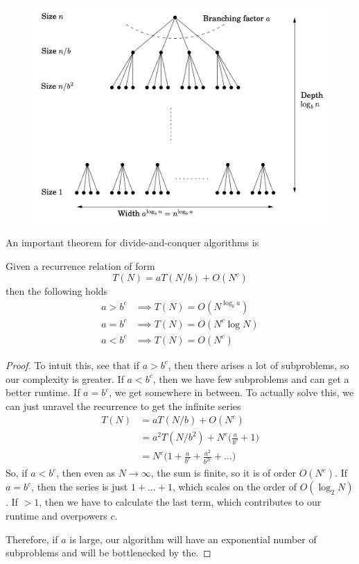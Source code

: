 \documentclass{article}
\begin{document}
    \begin{figure}[H]
      \centering 
      \includegraphics[scale=0.4]{img/branching.png}
      \caption{} 
      \label{fig:branching}
    \end{figure}

    An important theorem for divide-and-conquer algorithms is 

    \begin{theorem}
      Given a recurrence relation of form 
      \begin{equation}
        T(N) = a T(N/b) + O(N^c)
      \end{equation}
      then the following holds 
      \begin{align}
        a > b^c & \implies T(N) = O(N^{\log_b a}) \\
        a = b^c & \implies T(N) = O(N^c \log{N}) \\
        a < b^c & \implies T(N) = O(N^c) 
      \end{align}
    \end{theorem}
    \begin{proof}
      To intuit this, see that if $a > b^c$, then there arises a lot of subproblems, so our complexity is greater. If $a < b^c$, then we have few subproblems and can get a better runtime. If $a = b^c$, we get somewhere in between. To actually solve this, we can just unravel the recurrence to get the infinite series 
      \begin{align}
        T(N) & = a T(N/b) + O(N^c) \\
             & = a^2 T(N/b^2) +  N^c \bigg( \frac{a}{b^c} + 1 \bigg) \\
             & =  N^c \bigg( 1 + \frac{a}{b^c} + \frac{a^2}{b^{2c}} + \ldots \bigg)
      \end{align}
      So, if $a < b^c$, then even as $N \rightarrow \infty$, the sum is finite, so it is of order $O(N^c)$. If $a = b^c$, then the series is just $1 + \ldots + 1$, which scales on the order of $O(\log_2 {N})$. If $> 1$, then we have to calculate the last term, which contributes to our runtime and overpowers $c$.  
      
      Therefore, if $a$ is large, our algorithm will have an exponential number of subproblems and will be bottlenecked by the. 
    \end{proof}
\end{document}
